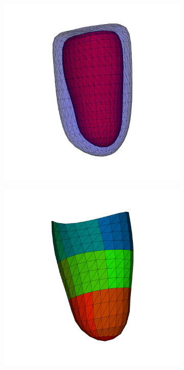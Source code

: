 \begin{figure}[htbp]
  \centering
  \begin{subfigure}[t]{0.45\textwidth}
    \includegraphics[width=\textwidth]{chapters/introduction/figures/geometry/raw.png}
    \caption{\label{fig:echopac_out_surf}}
  \end{subfigure}
  \begin{subfigure}[t]{0.45\textwidth}
    \includegraphics[width=\textwidth]{chapters/introduction/figures/geometry/strain_mesh.png}
    \caption{\label{fig:echopac_out_strain_mesh}}
  \end{subfigure}
\caption{}
\label{fig:echopac_output}
\end{figure}


